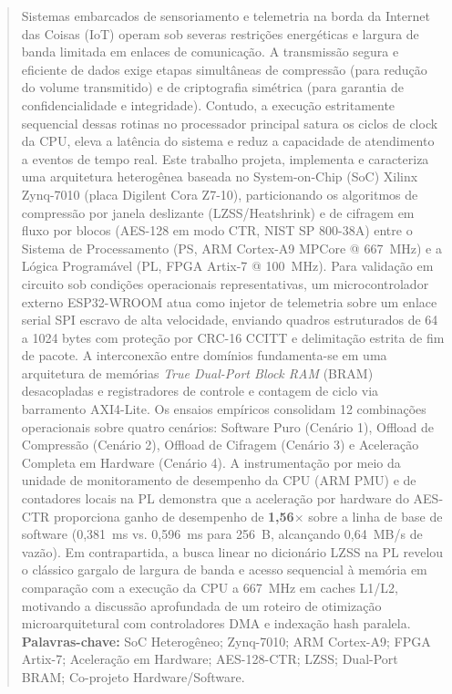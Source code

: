 \documentclass[11pt,a4paper]{article}
\begin{document}
\begin{abstract}
\noindent
Sistemas embarcados de sensoriamento e telemetria na borda da Internet das Coisas (IoT) operam sob severas restrições energéticas e largura de banda limitada em enlaces de comunicação. A transmissão segura e eficiente de dados exige etapas simultâneas de compressão (para redução do volume transmitido) e de criptografia simétrica (para garantia de confidencialidade e integridade). Contudo, a execução estritamente sequencial dessas rotinas no processador principal satura os ciclos de clock da CPU, eleva a latência do sistema e reduz a capacidade de atendimento a eventos de tempo real. Este trabalho projeta, implementa e caracteriza uma arquitetura heterogênea baseada no System-on-Chip (SoC) Xilinx Zynq-7010 (placa Digilent Cora Z7-10), particionando os algoritmos de compressão por janela deslizante (LZSS/Heatshrink) e de cifragem em fluxo por blocos (AES-128 em modo CTR, NIST SP 800-38A) entre o Sistema de Processamento (PS, ARM Cortex-A9 MPCore @ 667~MHz) e a Lógica Programável (PL, FPGA Artix-7 @ 100~MHz). Para validação em circuito sob condições operacionais representativas, um microcontrolador externo ESP32-WROOM atua como injetor de telemetria sobre um enlace serial SPI escravo de alta velocidade, enviando quadros estruturados de 64 a 1024 bytes com proteção por CRC-16 CCITT e delimitação estrita de fim de pacote. A interconexão entre domínios fundamenta-se em uma arquitetura de memórias \textit{True Dual-Port Block RAM} (BRAM) desacopladas e registradores de controle e contagem de ciclo via barramento AXI4-Lite. Os ensaios empíricos consolidam 12 combinações operacionais sobre quatro cenários: Software Puro (Cenário 1), Offload de Compressão (Cenário 2), Offload de Cifragem (Cenário 3) e Aceleração Completa em Hardware (Cenário 4). A instrumentação por meio da unidade de monitoramento de desempenho da CPU (ARM PMU) e de contadores locais na PL demonstra que a aceleração por hardware do AES-CTR proporciona ganho de desempenho de \textbf{1,56$\times$} sobre a linha de base de software (0,381~ms vs. 0,596~ms para 256~B, alcançando 0,64~MB/s de vazão). Em contrapartida, a busca linear no dicionário LZSS na PL revelou o clássico gargalo de largura de banda e acesso sequencial à memória em comparação com a execução da CPU a 667~MHz em caches L1/L2, motivando a discussão aprofundada de um roteiro de otimização microarquitetural com controladores DMA e indexação hash paralela.
\\[0.3cm]
\textbf{Palavras-chave:} SoC Heterogêneo; Zynq-7010; ARM Cortex-A9; FPGA Artix-7; Aceleração em Hardware; AES-128-CTR; LZSS; Dual-Port BRAM; Co-projeto Hardware/Software.
\end{abstract}
\end{document}
